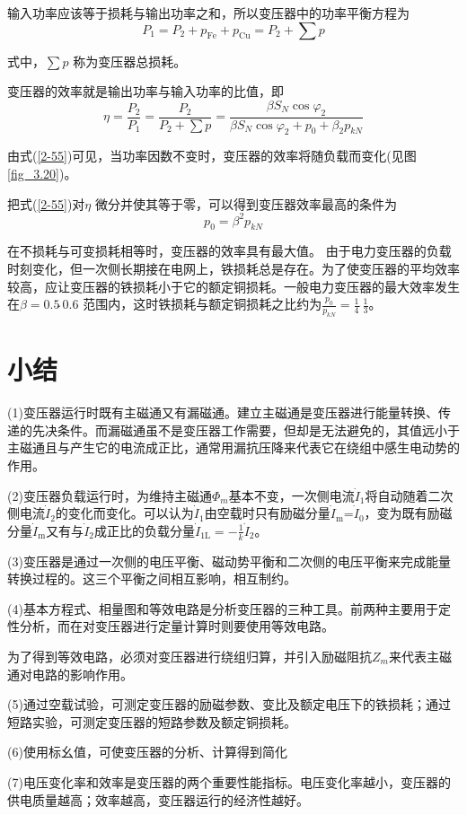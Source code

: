 \documentclass{book}
\begin{document}
输入功率应该等于损耗与输出功率之和，所以变压器中的功率平衡方程为
$${{P}_{1}}={{P}_{2}}+{{p}_{\text{Fe}}}+{{p}_{\text{Cu}}}={{P}_{2}}+\sum{p}$$

式中，$\sum{p}$ 称为变压器总损耗。

变压器的效率就是输出功率与输入功率的比值，即
\begin{equation}
\eta =\frac{{{P}_{2}}}{{{P}_{1}}}=\frac{{{P}_{2}}}{{{P}_{2}}+\sum{p}}=\frac{\beta {{S}_{N}}\cos {{\varphi }_{2}}}{\beta {{S}_{N}}\cos {{\varphi }_{2}}+{{p}_{0}}+{{\beta }_{2}}{{p}_{kN}}}
\label{2-55}
\end{equation}

由式(\ref{2-55})可见，当功率因数不变时，变压器的效率将随负载而变化(见图\ref{fig_3.20})。

把式(\ref{2-55})对$\eta $ 微分并使其等于零，可以得到变压器效率最高的条件为
\begin{equation}
{{p}_{0}}={{\beta }^{2}}{{p}_{kN}}
\label{2-57}
\end{equation}

在不损耗与可变损耗相等时，变压器的效率具有最大值。
由于电力变压器的负载时刻变化，但一次侧长期接在电网上，铁损耗总是存在。为了使变压器的平均效率较高，应让变压器的铁损耗小于它的额定铜损耗。一般电力变压器的最大效率发生在$\beta =0.5\tilde{\ }0.6$ 范围内，这时铁损耗与额定铜损耗之比约为$\frac{{{p}_{0}}}{{{p}_{kN}}}=\frac{1}{4}\tilde{\ }\frac{1}{3}$。
\section{小结}
(1)变压器运行时既有主磁通又有漏磁通。建立主磁通是变压器进行能量转换、传递的先决条件。而漏磁通虽不是变压器工作需要，但却是无法避免的，其值远小于主磁通且与产生它的电流成正比，通常用漏抗压降来代表它在绕组中感生电动势的作用。

(2)变压器负载运行时，为维持主磁通${{\Phi }_{m}}$基本不变，一次侧电流${{\dot{I}}_{1}}$将自动随着二次侧电流${{\dot{I}}_{2}}$的变化而变化。可以认为${{\dot{I}}_{1}}$由空载时只有励磁分量${{\dot{I}}_{\text{m}}}\text{=}{{\dot{I}}_{0}}$，变为既有励磁分量${{\dot{I}}_{\text{m}}}$又有与${{\dot{I}}_{2}}$成正比的负载分量${{\dot{I}}_{\text{1L}}}=-\frac{1}{k}{{\dot{I}}_{2}}$。

(3)变压器是通过一次侧的电压平衡、磁动势平衡和二次侧的电压平衡来完成能量转换过程的。这三个平衡之间相互影响，相互制约。

(4)基本方程式、相量图和等效电路是分析变压器的三种工具。前两种主要用于定性分析，而在对变压器进行定量计算时则要使用等效电路。

为了得到等效电路，必须对变压器进行绕组归算，并引入励磁阻抗${{Z}_{m}}$来代表主磁通对电路的影响作用。

(5)通过空载试验，可测定变压器的励磁参数、变比及额定电压下的铁损耗；通过短路实验，可测定变压器的短路参数及额定铜损耗。

(6)使用标幺值，可使变压器的分析、计算得到简化

(7)电压变化率和效率是变压器的两个重要性能指标。电压变化率越小，变压器的供电质量越高；效率越高，变压器运行的经济性越好。
\end{document}
